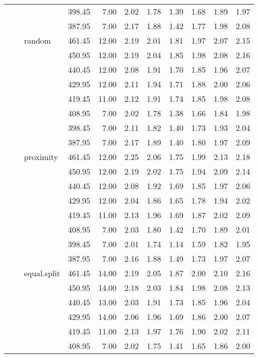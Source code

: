 \begin{longtable}{llllrrrrrrr}
   &  &  & 398.45 & 7.00 & 2.02 & 1.78 & 1.39 & 1.68 & 1.89 & 1.97 \\ 
   &  &  & 387.95 & 7.00 & 2.17 & 1.88 & 1.42 & 1.77 & 1.98 & 2.08 \\ 
   &  & random & 461.45 & 12.00 & 2.19 & 2.01 & 1.81 & 1.97 & 2.07 & 2.15 \\ 
   &  &  & 450.95 & 12.00 & 2.19 & 2.04 & 1.85 & 1.98 & 2.08 & 2.16 \\ 
   &  &  & 440.45 & 12.00 & 2.08 & 1.91 & 1.70 & 1.85 & 1.96 & 2.07 \\ 
   &  &  & 429.95 & 12.00 & 2.11 & 1.94 & 1.71 & 1.88 & 2.00 & 2.06 \\ 
   &  &  & 419.45 & 11.00 & 2.12 & 1.91 & 1.74 & 1.85 & 1.98 & 2.08 \\ 
   &  &  & 408.95 & 7.00 & 2.02 & 1.78 & 1.38 & 1.66 & 1.84 & 1.98 \\ 
   &  &  & 398.45 & 7.00 & 2.11 & 1.82 & 1.40 & 1.73 & 1.93 & 2.04 \\ 
   &  &  & 387.95 & 7.00 & 2.17 & 1.89 & 1.40 & 1.80 & 1.97 & 2.09 \\ 
   &  & proximity & 461.45 & 12.00 & 2.25 & 2.06 & 1.75 & 1.99 & 2.13 & 2.18 \\ 
   &  &  & 450.95 & 12.00 & 2.19 & 2.02 & 1.75 & 1.94 & 2.09 & 2.14 \\ 
   &  &  & 440.45 & 12.00 & 2.08 & 1.92 & 1.69 & 1.85 & 1.97 & 2.06 \\ 
   &  &  & 429.95 & 12.00 & 2.04 & 1.86 & 1.65 & 1.78 & 1.94 & 2.02 \\ 
   &  &  & 419.45 & 11.00 & 2.13 & 1.96 & 1.69 & 1.87 & 2.02 & 2.09 \\ 
   &  &  & 408.95 & 7.00 & 2.03 & 1.80 & 1.42 & 1.70 & 1.89 & 2.01 \\ 
   &  &  & 398.45 & 7.00 & 2.01 & 1.74 & 1.14 & 1.59 & 1.82 & 1.95 \\ 
   &  &  & 387.95 & 7.00 & 2.16 & 1.88 & 1.49 & 1.73 & 1.97 & 2.07 \\ 
   &  & equal.split & 461.45 & 14.00 & 2.19 & 2.05 & 1.87 & 2.00 & 2.10 & 2.16 \\ 
   &  &  & 450.95 & 14.00 & 2.18 & 2.03 & 1.84 & 1.98 & 2.08 & 2.13 \\ 
   &  &  & 440.45 & 13.00 & 2.03 & 1.91 & 1.73 & 1.85 & 1.96 & 2.04 \\ 
   &  &  & 429.95 & 14.00 & 2.06 & 1.96 & 1.69 & 1.86 & 2.00 & 2.07 \\ 
   &  &  & 419.45 & 11.00 & 2.13 & 1.97 & 1.76 & 1.90 & 2.02 & 2.11 \\ 
   &  &  & 408.95 & 7.00 & 2.02 & 1.75 & 1.41 & 1.65 & 1.86 & 2.00 \\ 

\end{longtable}
